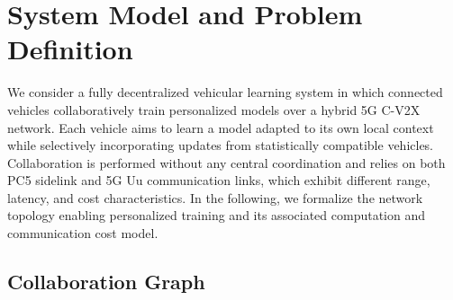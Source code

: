 \section{System Model and Problem Definition}
\label{sec:system_model}


We consider a fully decentralized vehicular learning system in which connected vehicles collaboratively train personalized models over a hybrid 5G C-V2X network. Each vehicle aims to learn a model adapted to its own local context while selectively incorporating updates from statistically compatible vehicles. Collaboration is performed without any central coordination and relies on both PC5 sidelink and 5G Uu communication links, which exhibit different range, latency, and cost characteristics. In the following, we formalize the network topology enabling personalized training and its associated computation and communication cost model.

\subsection{Collaboration Graph}

